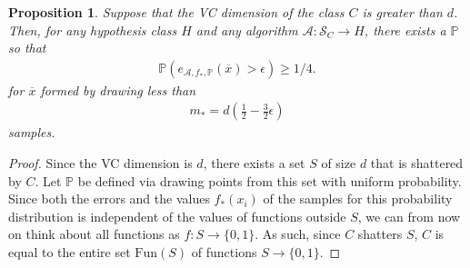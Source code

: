 \documentclass{article}
\newcommand{\calA}{\mathcal{A}}
\newcommand{\calS}{\mathcal{S}}
\newtheorem{prop}{Proposition}
\begin{document}
\begin{prop}
    Suppose that the VC dimension of the class $C$ is greater than $d$. Then, for any hypothesis class $H$ and any algorithm $\calA: \calS_C\to H$, there exists a $\mathbb{P}$ so that 
    \begin{align*}
        \mathbb{P}(e_{\calA,f_*,\mathbb{P}}(\overline{x})>\epsilon)\geq 1/4.
    \end{align*}
    for $\overline{x}$ formed by drawing less than
    \begin{align*}
        m_* = d \left(\frac{1}{2} - \frac{3}{2}\epsilon\right)
    \end{align*}
    samples.
\end{prop}
\begin{proof}
    Since the VC dimension is $d$, there exists a set $S$ of size $d$ that is shattered by $C$. Let $\mathbb{P}$ be defined via drawing points from this set with uniform probability. Since both the errors and the values $f_*(x_i)$ of the samples for this probability distribution is independent of the values of functions outside $S$, we can from now on think about all functions as $f:S\to \{0,1\}$. As such, since $C$ shatters $S$, $C$ is equal to the entire set $\mathrm{Fun}(S)$ of functions $S\to \{0,1\}$.


\end{proof}
\end{document}
